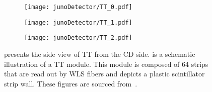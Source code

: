 \begin{figure}[htbp]
	\centering
	\begin{subfigure}{0.75\textwidth}
		\centering
		\texttt{[image: junoDetector/TT\_0.pdf]}
		\caption{}
		\label{fig:TT_0}
	\end{subfigure}%
	\hfill
	\begin{subfigure}{0.5\textwidth}
		\centering
		\texttt{[image: junoDetector/TT\_1.pdf]}
		\caption{}
		\label{fig:TT_1}
	\end{subfigure}%
	\hfill
	\begin{subfigure}{0.5\textwidth}
		\centering
		\texttt{[image: junoDetector/TT\_2.pdf]}
		\caption{}
		\label{fig:TT_2}
	\end{subfigure}
	\caption{ presents the side view of TT from the CD side.  is a schematic illustration of a TT module. This module is composed of 64 strips that are read out by WLS fibers and  depicts a plastic scintillator strip wall. These figures are sourced from~\cite{top_tracker}.}
	\label{fig:juno_TT}
\end{figure}